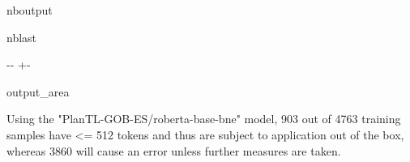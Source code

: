 \documentclass[letterpaper,10pt,english]{sphinxmanual}
\newlength\nbsphinxcodecellspacing
\begin{document}
\begin{sphinxuseclass}{nboutput}
\begin{sphinxuseclass}{nblast}
{

\kern-\sphinxverbatimsmallskipamount\kern-\baselineskip
\kern+\FrameHeightAdjust\kern-\fboxrule
\vspace{\nbsphinxcodecellspacing}

\begin{sphinxuseclass}{output_area}
\begin{sphinxuseclass}{}


\begin{sphinxVerbatim}[commandchars=\\\{\}]
Using the "PlanTL-GOB-ES/roberta-base-bne" model, 903 out of 4763 training samples have <= 512 tokens and thus are subject to application out of the box, whereas 3860 will cause an error unless further measures are taken.
\end{sphinxVerbatim}



\end{sphinxuseclass}
\end{sphinxuseclass}
}

\end{sphinxuseclass}
\end{sphinxuseclass}
\end{document}
